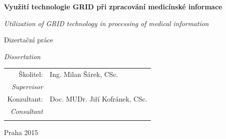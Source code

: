 \begin{center}
\vspace{8mm}

\textbf{\large Využití technologie GRID při zpracování medicínské informace}

\vspace{2mm}
\textit{\large Utilization of GRID technology in processing of medical information}

\vfill



{\Large Dizertační práce}

\textit{\large Dissertation}

\vfill


\begin{tabular}{rl}

Školitel: & Ing. Milan Šárek, CSc. \\
\noalign{\vspace{-1mm}}
\textit{Supervisor} \\
\noalign{\vspace{2mm}}
Konzultant: & Doc. MUDr. Jiří Kofránek, CSc. \\
\noalign{\vspace{-1mm}}
\textit{Consultant} \\
\noalign{\vspace{2mm}}
\end{tabular}

\vfill

Praha 2015

\end{center}
\newpage
\mbox{}
